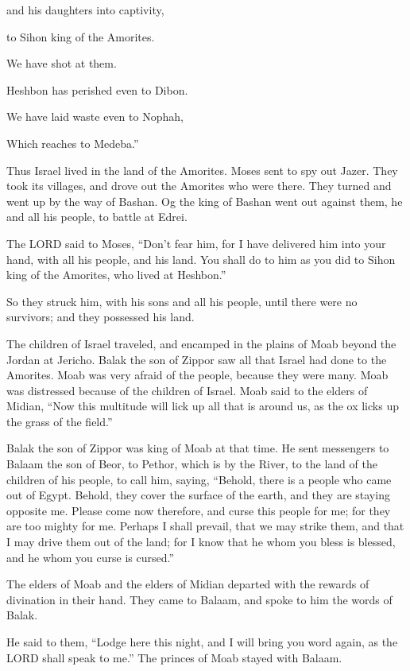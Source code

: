 and his daughters into captivity,

to Sihon king of the Amorites.


\myverse{}We have shot at them.

Heshbon has perished even to Dibon.

We have laid waste even to Nophah,

Which reaches to Medeba.”


\myverse{}Thus Israel lived in the land of the Amorites.
\myverse{}Moses sent to spy out Jazer. They took its villages, and drove out the Amorites
who were there.
\myverse{}They turned and went up by the way of Bashan. Og the king of Bashan went
out against them, he and all his people, to battle at Edrei.


\myverse{}The LORD said to Moses, “Don’t fear him, for I have delivered
him into your hand, with all his people, and his land. You shall do to him as you did to Sihon king of
the Amorites, who lived at Heshbon.”


\myverse{}So they struck him, with his sons and all his people, until
there were no survivors; and they possessed his land.


\mychapter{} \myverse*{}The children of Israel traveled, and encamped in the plains of
Moab beyond the Jordan at Jericho.
\myverse{}Balak the son of Zippor saw all that Israel had done to the Amorites.
\myverse{}Moab was very afraid of the people, because they were many. Moab was distressed
because of the children of Israel.
\myverse{}Moab said to the elders of Midian, “Now this multitude will lick up all that
is around us, as the ox licks up the grass of the field.”

Balak the son of Zippor was king of Moab at that time.
\myverse{}He sent messengers to Balaam the son of Beor, to Pethor, which is by the River,
to the land of the children of his people, to call him, saying, “Behold, there is a people who came out
of Egypt. Behold, they cover the surface of the earth, and they are staying opposite me.
\myverse{}Please come now therefore, and curse this people for me; for they are too mighty
for me. Perhaps I shall prevail, that we may strike them, and that I may drive them out of the land; for
I know that he whom you bless is blessed, and he whom you curse is cursed.”


\myverse{}The elders of Moab and the elders of Midian departed with the
rewards of divination in their hand. They came to Balaam, and spoke to him the words of Balak.


\myverse{}He said to them, “Lodge here this night, and I will bring you
word again, as the LORD shall speak to me.” The princes of Moab stayed with Balaam.


